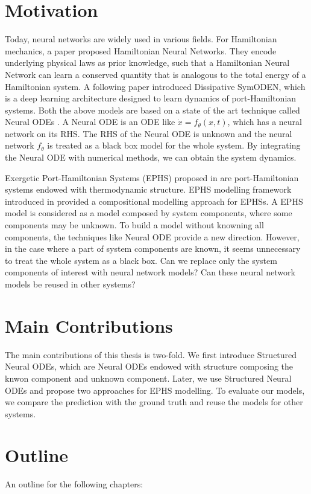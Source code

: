 \documentclass[
	parskip, 			   %
	twoside, 			   %
	DIV=14, 			   %
	BCOR=15.0mm, 		   %
	headsepline, 		   %
	open=right, 		   %
	captions=tableheading, %
	bibliography=totoc,    %
	numbers=noenddot       %
]{scrreprt}
\begin{document}
\section{Motivation}
Today, neural networks are widely used in various fields. For Hamiltonian mechanics, a paper \cite{greydanus2019hamiltonian} proposed Hamiltonian Neural Networks. They encode underlying physical laws as prior knowledge, such that a Hamiltonian Neural Network can learn a conserved quantity that is analogous to the total energy of a Hamiltonian system. A following paper \cite{zhong2020dissipative} introduced Dissipative SymODEN, which is a deep learning architecture designed to learn dynamics of port-Hamiltonian systems. Both the above models are based on a state of the art technique called Neural ODEs \cite{chen2018neural}. A Neural ODE is an ODE like $\dot{x} = f_{\theta}(x, t)$, which has a neural network on its RHS. The RHS of the Neural ODE is unknown and the neural network $f_{\theta}$ is treated as a black box model for the whole system. By integrating the Neural ODE with numerical methods, we can obtain the system dynamics.

Exergetic Port-Hamiltonian Systems (EPHS) proposed in \cite{lohmayer2021exergetic} are port-Hamiltonian systems endowed with thermodynamic structure. EPHS modelling framework introduced in \cite{lohmayer2022ephs} provided a compositional modelling approach for EPHSs. A EPHS model is considered as a model composed by system components, where some components may be unknown. To build a model without knowning all components, the techniques like Neural ODE provide a new direction. However, in the case where a part of system components are known, it seems unnecessary to treat the whole system as a black box. Can we replace only the system components of interest with neural network models? Can these neural network models be reused in other systems?

\section{Main Contributions}
The main contributions of this thesis is two-fold. We first introduce Structured Neural ODEs, which are Neural ODEs endowed with structure composing the knwon component and unknown component. Later, we use Structured Neural ODEs and propose two approaches for EPHS modelling. To evaluate our models, we compare the prediction with the ground truth and reuse the models for other systems.

\section{Outline}
An outline for the following chapters:
\end{document}
